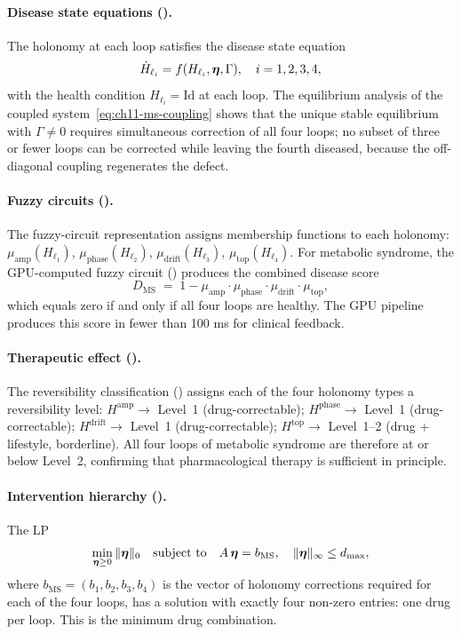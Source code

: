 \paragraph{Disease state equations ().}
The holonomy at each loop satisfies the disease state equation
\[
  \dot{H}_{\ell_i} = f(H_{\ell_i}, \boldsymbol{\eta}, \Gamma), \quad i = 1,2,3,4,
\]
with the health condition $H_{\ell_i} = \mathrm{Id}$ at each loop.  The
equilibrium analysis of the coupled system~\eqref{eq:ch11-ms-coupling}
shows that the unique stable equilibrium with $\Gamma \neq 0$ requires
simultaneous correction of all four loops; no subset of three or fewer
loops can be corrected while leaving the fourth diseased, because the
off-diagonal coupling regenerates the defect.

\paragraph{Fuzzy circuits ().}
The fuzzy-circuit representation assigns membership functions to each
holonomy: $\mu_{\mathrm{amp}}(H_{\ell_1})$, $\mu_{\mathrm{phase}}(H_{\ell_2})$,
$\mu_{\mathrm{drift}}(H_{\ell_3})$, $\mu_{\mathrm{top}}(H_{\ell_4})$.  For
metabolic syndrome, the GPU-computed fuzzy circuit ()
produces the combined disease score
\[
  D_{\mathrm{MS}}
  \;=\;
  1 - \mu_{\mathrm{amp}} \cdot \mu_{\mathrm{phase}} \cdot \mu_{\mathrm{drift}} \cdot \mu_{\mathrm{top}},
\]
which equals zero if and only if all four loops are healthy.  The GPU pipeline
produces this score in fewer than 100 ms for clinical feedback.

\paragraph{Therapeutic effect ().}
The reversibility classification () assigns each
of the four holonomy types a reversibility level:
$H^{\mathrm{amp}} \to$ Level~1 (drug-correctable);
$H^{\mathrm{phase}} \to$ Level~1 (drug-correctable);
$H^{\mathrm{drift}} \to$ Level~1 (drug-correctable);
$H^{\mathrm{top}} \to$ Level~1--2 (drug + lifestyle, borderline).
All four loops of metabolic syndrome are therefore at or below Level~2,
confirming that pharmacological therapy is sufficient in principle.

\paragraph{Intervention hierarchy ().}
The LP
\begin{equation}
\label{eq:ch11-ms-lp}
  \min_{\boldsymbol{\eta} \geq 0} \|\boldsymbol{\eta}\|_0
  \quad \text{subject to} \quad
  A\,\boldsymbol{\eta} = b_{\mathrm{MS}},\quad \|\boldsymbol{\eta}\|_\infty \leq d_{\max},
\end{equation}
where $b_{\mathrm{MS}} = (b_1, b_2, b_3, b_4)$ is the vector of holonomy
corrections required for each of the four loops, has a solution with exactly
four non-zero entries: one drug per loop.  This is the minimum drug combination.

